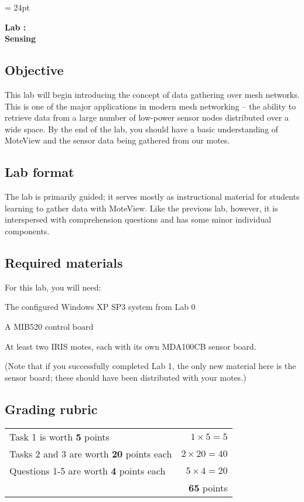 \documentclass{article}
\begin{document}
\chead{\textcolor{Gray}{CSSE491 -- Mesh Networking Lab Assignment}}
\headsep = 24pt

\begin{center}
{ \large
\textbf{Lab \labnumber: \longproductname} \\
\textbf{Sensing}
}
\end{center}

\subsection*{Objective}
This lab will begin introducing the concept of data gathering over mesh networks. This is one of the major applications in modern mesh networking -- the ability to retrieve data from a large number of low-power sensor nodes distributed over a wide space. By the end of the lab, you should have a basic understanding of MoteView and the sensor data being gathered from our motes.

\subsection*{Lab format}
The lab is primarily guided; it serves mostly as instructional material for students learning to gather data with MoteView. Like the previous lab, however, it is interspersed with comprehension questions and has some minor individual components.

\subsection*{Required materials}
For this lab, you will need:

\begin{itemize*}
\item The configured Windows XP SP3 system from Lab 0
\item A MIB520 control board
\item At least two IRIS motes, each with its own MDA100CB sensor board.
\end{itemize*}

(Note that if you successfully completed Lab 1, the only new material here is the sensor board; these should have been distributed with your motes.)

\subsection*{Grading rubric}
\begin{tabular}{p{5.5in} r}
Task 1 is worth \textbf{5} points & $1 \times 5 = 5$ \\
Tasks 2 and 3 are worth \textbf{20} points each & $2 \times 20 = 40$ \\
Questions 1-5 are worth \textbf{4} points each & $5 \times 4 = 20$ \\ \hline
& \textbf{65} points
\end{tabular}
\end{document}
